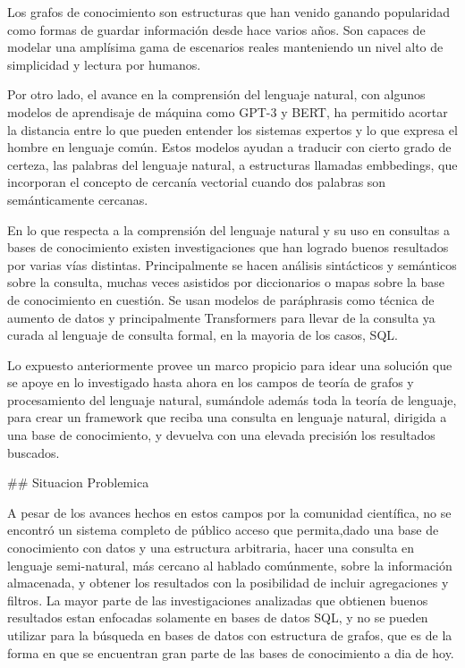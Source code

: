 Los grafos de conocimiento son estructuras que han venido ganando popularidad como formas de guardar información desde hace varios años. Son capaces de modelar una amplísima gama de escenarios reales manteniendo un nivel alto de simplicidad y lectura por humanos.

Por otro lado, el avance en la comprensión del lenguaje natural, con algunos modelos de aprendisaje de máquina como GPT-3 y BERT, ha permitido acortar la distancia entre lo que pueden entender los sistemas expertos y lo que expresa el hombre en lenguaje común. Estos modelos ayudan a traducir con cierto grado de certeza, las palabras del lenguaje natural, a estructuras llamadas embbedings, que incorporan el concepto de cercanía vectorial cuando dos palabras son semánticamente cercanas.

En lo que respecta a la comprensión del lenguaje natural y su uso en consultas a bases de conocimiento existen investigaciones que han logrado buenos resultados por varias vías distintas. Principalmente se hacen análisis sintácticos y semánticos sobre la consulta, muchas veces asistidos por diccionarios o mapas sobre la base de conocimiento en cuestión. Se usan modelos de paráphrasis como técnica de aumento de datos y principalmente Transformers para llevar de la consulta ya curada al lenguaje de consulta formal, en la mayoria de los casos, SQL.

Lo expuesto anteriormente provee un marco propicio para idear una solución que se apoye en lo investigado hasta ahora en los campos de teoría de grafos y procesamiento del lenguaje natural, sumándole además toda la teoría de lenguaje, para crear un framework que reciba una consulta en lenguaje natural, dirigida a una base de conocimiento, y devuelva con una elevada precisión los resultados buscados.


## Situacion Problemica

A pesar de los avances hechos en estos campos por la comunidad científica, no se encontró un sistema completo de público acceso que permita,dado una base de conocimiento con datos y una estructura arbitraria, hacer una consulta en lenguaje semi-natural, más cercano al hablado comúnmente, sobre la información almacenada, y obtener los resultados con la posibilidad de incluir agregaciones y filtros. La mayor parte de las investigaciones analizadas que obtienen buenos resultados estan enfocadas solamente en bases de datos SQL, y no se pueden utilizar para la búsqueda en bases de datos con estructura de grafos, que es de la forma en que se encuentran gran parte de las bases de conocimiento a dia de hoy.


